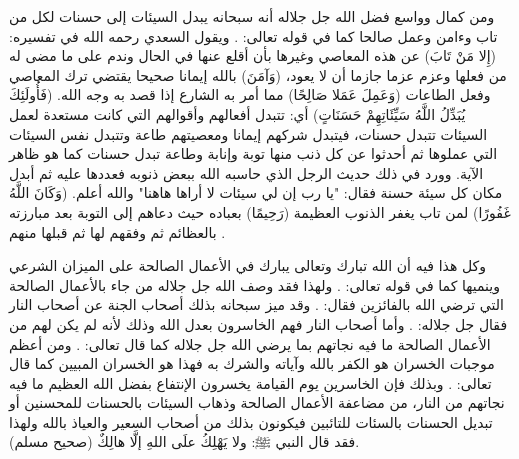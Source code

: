 ومن كمال وواسع فضل الله جل جلاله أنه سبحانه يبدل السيئات إلى حسنات لكل من تاب وءامن وعمل صالحا كما في قوله تعالى: \quranayah*[25][70]{\footnotesize \surahname*[25]}. ويقول السعدي رحمه الله في تفسيره: (إِلا مَنْ تَابَ) عن هذه المعاصي وغيرها بأن أقلع عنها في الحال وندم على ما مضى له من فعلها وعزم عزما جازما أن لا يعود، (وَآمَنَ) بالله إيمانا صحيحا يقتضي ترك المعاصي وفعل الطاعات (وَعَمِلَ عَمَلا صَالِحًا) مما أمر به الشارع إذا قصد به وجه الله. (فَأُولَئِكَ يُبَدِّلُ اللَّهُ سَيِّئَاتِهِمْ حَسَنَاتٍ) أي: تتبدل أفعالهم وأقوالهم التي كانت مستعدة لعمل السيئات تتبدل حسنات، فيتبدل شركهم إيمانا ومعصيتهم طاعة وتتبدل نفس السيئات التي عملوها ثم أحدثوا عن كل ذنب منها توبة وإنابة وطاعة تبدل حسنات كما هو ظاهر الآية. وورد في ذلك حديث الرجل الذي حاسبه الله ببعض ذنوبه فعددها عليه ثم أبدل مكان كل سيئة حسنة فقال: "يا رب إن لي سيئات لا أراها هاهنا" والله أعلم. (وَكَانَ اللَّهُ غَفُورًا) لمن تاب يغفر الذنوب العظيمة (رَحِيمًا) بعباده حيث دعاهم إلى التوبة بعد مبارزته بالعظائم ثم وفقهم لها ثم قبلها منهم \href{https://shamela.ws/book/42/1329#p5}{\faExternalLink} \cite{tafsir_Saadi}.

وكل هذا فيه أن الله تبارك وتعالى يبارك في الأعمال الصالحة على الميزان الشرعي وينميها كما في قوله تعالى: 
\quranayah*[2][261]{\footnotesize \surahname*[2]}. ولهذا فقد وصف الله جل جلاله من جاء بالأعمال الصالحة التي ترضي الله بالفائزين فقال: 
\quranayah*[24][52]{\footnotesize \surahname*[24]}.
 وقد ميز سبحانه بذلك أصحاب الجنة عن أصحاب النار فقال جل جلاله: 
\quranayah*[59][20]{\footnotesize \surahname*[59]}. وأما أصحاب النار فهم الخاسرون بعدل الله وذلك لأنه لم يكن لهم من الأعمال الصالحة ما فيه نجاتهم بما يرضي الله جل جلاله كما قال تعالى: 
\quranayah*[2][27]{\footnotesize \surahname*[2]}. ومن أعظم موجبات الخسران هو الكفر بالله وآياته والشرك به فهذا هو الخسران المبيين كما قال تعالى: 
\quranayah*[39][15]{\footnotesize \surahname*[39]}. وبذلك فإن الخاسرين يوم القيامة يخسرون الإنتفاع بفضل الله العظيم ما فيه نجاتهم من النار، من مضاعفة الأعمال الصالحة وذهاب السيئات بالحسنات للمحسنين أو تبديل الحسنات بالسئات للتائبين فيكونون بذلك من أصحاب السعير والعياذ بالله ولهذا فقد قال النبي ﷺ: ولا يَهْلِكُ علَى اللهِ إلَّا هالِكٌ {\footnotesize (صحيح مسلم)}.

